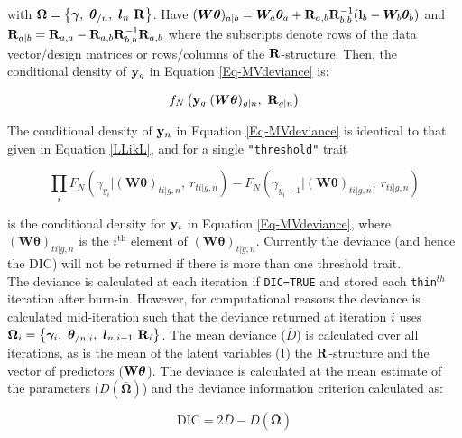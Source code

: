 \documentclass{article}
\begin{document}
with ${\bm \Omega} = \left\{{\bm \gamma},\ {\bm \theta}_{/n},\ {\bm l}_{n}\ {\bf R}\right\}$.  Have $({\bm W}{\bm \theta})_{a|b}={\bm W}_{a}{\bm \theta}_{a}+{\bf R}_{a,b}{\bf R}^{-1}_{b,b}({\bf l}_{b}-{\bm W}_{b}{\bm \theta}_{b})$ and ${\bf R}_{a |b} = {\bf R}_{a,a}-{\bf R}_{a,b}{\bf R}^{-1}_{b,b}{\bf R}_{a,b}$ where the subscripts denote rows of the data vector/design matrices or rows/columns of the ${\bf R}$-structure.
Then, the conditional density of ${\bf y}_{g}$ in Equation \ref{Eq-MVdeviance} is:

\begin{equation}
f_{N}\left({\bf y}_{g} | ({\bm W}{\bm \theta})_{g|n},\ {\bf R}_{g|n}\right) 
\end{equation}

The conditional density of ${\bf y}_{n}$ in Equation \ref{Eq-MVdeviance} is identical to that given in Equation \ref{LLikL},  and for a single \texttt{"threshold"} trait  


\begin{equation}
\prod_{i} F_{N}(\gamma_{y_{i}} | ({\bm W}{\bm \theta})_{ti|g,n}, \ r_{ti|g, n})-F_{N}(\gamma_{y_{i}+1} | ({\bm W}{\bm \theta})_{ti|g,n}, \ r_{ti|g, n})
\label{Eq-cpmvnorm}
\end{equation}

is the conditional density for ${\bf y}_{t}$ in Equation \ref{Eq-MVdeviance}, where $({\bm W}{\bm \theta})_{ti|g,n}$ is the $i^{\textrm{th}}$ element of $({\bm W}{\bm \theta})_{t|g,n}$. Currently the deviance (and hence the DIC) will not be returned if there is more than one threshold trait.\\

The deviance is calculated at each iteration if \texttt{DIC=TRUE} and stored each \texttt{thin}$^{th}$ iteration after burn-in.  However, for computational reasons the deviance is calculated mid-iteration such that the deviance returned at iteration $i$  uses ${\bm \Omega}_{i} = \left\{{\bm \gamma}_{i},\ {\bm \theta}_{/n, i},\ {\bm l}_{n, i-1}\ {\bf R}_{i}\right\}$. The mean deviance ($\bar{D}$) is calculated over all iterations, as is the mean of the latent variables (${\bf l}$) the ${\bf R}$-structure and the vector of predictors (${\bf W}{\bm \theta}$).  The deviance is calculated at the mean estimate of the parameters ($D(\bar{\bm \Omega})$) and the deviance information criterion calculated as:

\begin{equation}
\textrm{DIC} = 2\bar{D}-D(\bar{\bm \Omega})
\end{equation}
\end{document}
